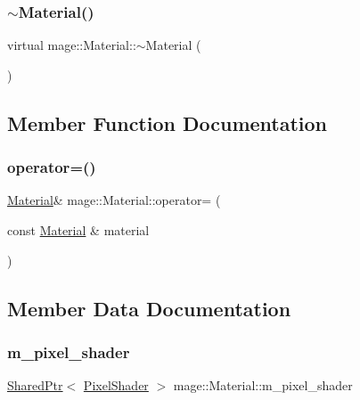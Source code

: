 \subsubsection{\texorpdfstring{$\sim$\+Material()}{~Material()}}
{\footnotesize\ttfamily virtual mage\+::\+Material\+::$\sim$\+Material (\begin{DoxyParamCaption}{ }\end{DoxyParamCaption})\hspace{0.3cm}{\ttfamily [virtual]}}



\subsection{Member Function Documentation}
\hypertarget{classmage_1_1_material_aeacdf92abf29de55d0440e1ee47fda02}{}\label{classmage_1_1_material_aeacdf92abf29de55d0440e1ee47fda02} 
\subsubsection{\texorpdfstring{operator=()}{operator=()}}
{\footnotesize\ttfamily \hyperlink{classmage_1_1_material}{Material}\& mage\+::\+Material\+::operator= (\begin{DoxyParamCaption}\item[{const \hyperlink{classmage_1_1_material}{Material} \&}]{material }\end{DoxyParamCaption})}



\subsection{Member Data Documentation}
\hypertarget{classmage_1_1_material_a2c8cc11322217b70c0cdab7de5188f3d}{}\label{classmage_1_1_material_a2c8cc11322217b70c0cdab7de5188f3d} 
\subsubsection{\texorpdfstring{m\+\_\+pixel\+\_\+shader}{m\_pixel\_shader}}
{\footnotesize\ttfamily \hyperlink{namespacemage_a1e01ae66713838a7a67d30e44c67703e}{Shared\+Ptr}$<$ \hyperlink{classmage_1_1_pixel_shader}{Pixel\+Shader} $>$ mage\+::\+Material\+::m\+\_\+pixel\+\_\+shader\hspace{0.3cm}{\ttfamily [protected]}}


